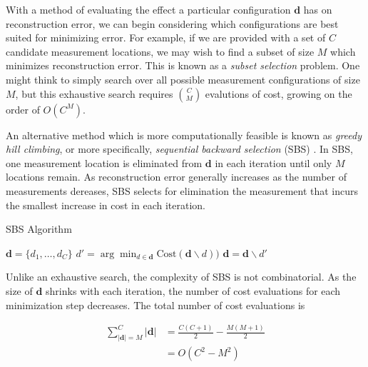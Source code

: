 \documentclass{article}
\begin{document}
With a method of evaluating the effect a particular configuration $\bm{d}$ has
on reconstruction error, we can begin considering which configurations are best
suited for minimizing error.  For example, if we are provided with a set of $C$
candidate measurement locations, we may wish to find a subset of size $M$ which
minimizes reconstruction error. This is known as a \emph{subset selection} problem.
One might think to simply  search over all possible measurement configurations
of size $M$, but this exhaustive search requires $\binom{C}{M}$ evalutions of
cost, growing on the order of $O(C^M)$.

An alternative method which is more computationally feasible is known as
\emph{greedy hill climbing}, or more specifically, \emph{sequential backward
selection} (SBS) \cite{sharif}. In SBS, one measurement location is eliminated from $\bm{d}$ in each
iteration until only $M$ locations remain. As reconstruction error generally
increases as the number of measurements dereases, SBS selects for elimination the
measurement that incurs the smallest increase in cost in each iteration.

\begin{algorithm}
  \begin{algorithmic}
    \caption{SBS Algorithm}
    \State $\bm{d} = \{d_1, \dots, d_C\}$
    \Repeat
      \State $d' = \arg \min_{d \in \bm{d}} \text{Cost}(\bm{d} \backslash d))$
      \State $\bm{d} = \bm{d} \backslash d'$
  \end{algorithmic}
\end{algorithm}

Unlike an exhaustive search, the complexity of SBS is not combinatorial.  As the
size of $\bm{d}$ shrinks with each iteration, the number of cost evaluations for each
minimization step decreases.  The total number of cost evaluations is

$$
\begin{aligned}
  \sum_{|\bm{d}| = M}^C |\bm{d}|
  &= \frac{C
    (C + 1)}{2} - \frac{M(M + 1)}{2} \\
  &= O(C^2 - M^2)
\end{aligned}
$$
\end{document}

